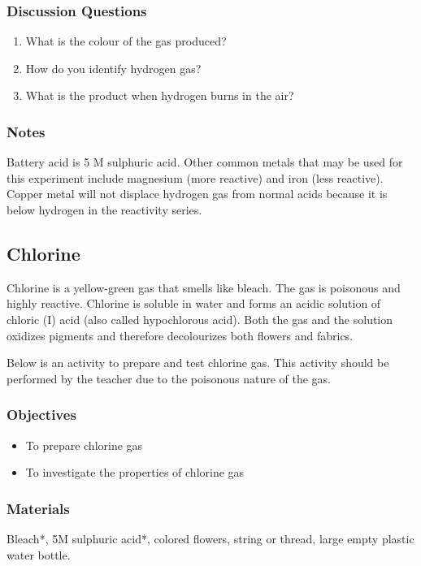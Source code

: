 \subsubsection*{Discussion Questions}
\begin{enumerate}
\item{What is the colour of the gas produced?}
\item{How do you identify hydrogen gas?}
\item{What is the product when hydrogen burns in the air?}
\end{enumerate}

\subsubsection*{Notes}
Battery acid is 5 M sulphuric acid. Other common metals that may be used for this experiment include magnesium (more reactive) and iron (less reactive). Copper metal will not displace hydrogen gas from normal acids because it is below hydrogen in the reactivity series.

\subsection{Chlorine}

Chlorine is a yellow-green gas that smells like bleach. The gas is poisonous and highly reactive. Chlorine is soluble in water and forms an acidic solution of chloric (I) acid (also called hypochlorous acid). Both the gas and the solution oxidizes pigments and therefore decolourizes both flowers and fabrics.

Below is an activity to prepare and test chlorine gas. This activity should be performed by the teacher due to the poisonous nature of the gas.

\subsubsection*{Objectives}
\begin{itemize}
\item{To prepare chlorine gas}
\item{To investigate the properties of chlorine gas}
\end{itemize}

\subsubsection*{Materials}
Bleach*, 5M sulphuric acid*, colored flowers, string or thread, large empty plastic water bottle.

